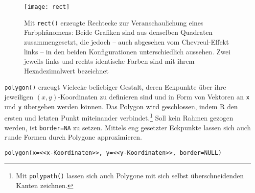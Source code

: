 \begin{figure}[ht]
\centering
\texttt{[image: rect]}
\vspace*{-1em}
\caption{Mit \lstinline!rect()! erzeugte Rechtecke zur Veranschaulichung eines Farbphänomens: Beide Grafiken sind aus denselben Quadraten zusammengesetzt, die jedoch -- auch abgesehen vom Chevreul-Effekt links -- in den beiden Konfigurationen unterschiedlich aussehen. Zwei jeweils links und rechts identische Farben sind mit ihrem Hexadezimalwert bezeichnet}
\label{fig:rect}
\end{figure}

\lstinline!polygon()! erzeugt Vielecke beliebiger Gestalt, deren Eckpunkte über ihre jeweiligen $(x, y)$-Koordinaten zu definieren sind und in Form von Vektoren an \lstinline!x! und \lstinline!y! übergeben werden können. Das Polygon wird geschlossen, indem R den ersten und letzten Punkt miteinander verbindet.\footnote{Mit  \lstinline!polypath()! lassen sich auch Polygone mit sich selbst überschneidenden Kanten zeichnen.} Soll kein Rahmen gezogen werden, ist \lstinline!border=NA! zu setzen. Mittels eng gesetzter Eckpunkte lassen sich auch runde Formen durch Polygone approximieren.
\begin{lstlisting}
polygon(x=<<x-Koordinaten>>, y=<<y-Koordinaten>>, border=NULL)
\end{lstlisting}


